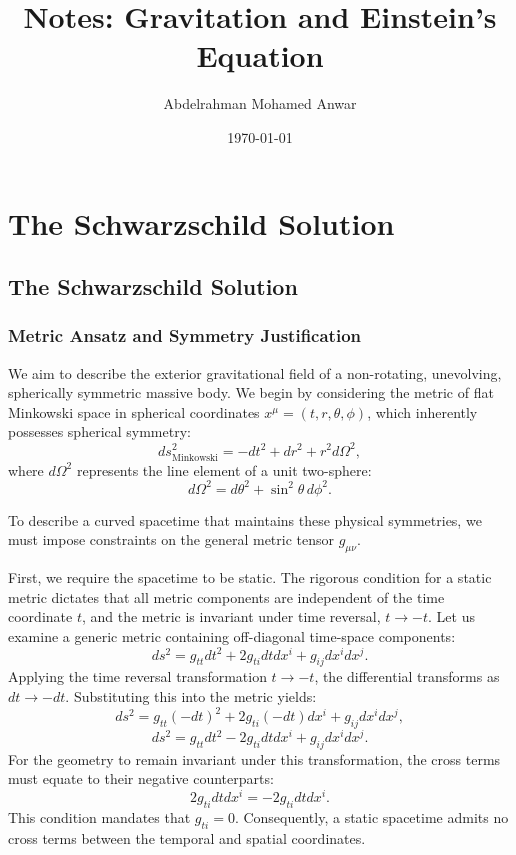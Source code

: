 \documentclass[11pt, a4paper]{report}
\title{Notes: Gravitation and Einstein's Equation}
\author{Abdelrahman Mohamed Anwar}
\date{\today}
\begin{document}
\tableofcontents

\chapter{The Schwarzschild Solution}
\section{The Schwarzschild Solution}

\subsection{Metric Ansatz and Symmetry Justification}

We aim to describe the exterior gravitational field of a non-rotating, unevolving, spherically symmetric massive body. We begin by considering the metric of flat Minkowski space in spherical coordinates $x^\mu = (t, r, \theta, \phi)$, which inherently possesses spherical symmetry:
\begin{equation}
ds_{\text{Minkowski}}^2 = -dt^2 + dr^2 + r^2 d\Omega^2,
\end{equation}
where $d\Omega^2$ represents the line element of a unit two-sphere:
\begin{equation}
d\Omega^2 = d\theta^2 + \sin^2\theta \, d\phi^2.
\end{equation}

To describe a curved spacetime that maintains these physical symmetries, we must impose constraints on the general metric tensor $g_{\mu\nu}$. 

First, we require the spacetime to be static. The rigorous condition for a static metric dictates that all metric components are independent of the time coordinate $t$, and the metric is invariant under time reversal, $t \rightarrow -t$. Let us examine a generic metric containing off-diagonal time-space components:
\begin{equation}
ds^2 = g_{tt} dt^2 + 2 g_{ti} dt dx^i + g_{ij} dx^i dx^j.
\end{equation}
Applying the time reversal transformation $t \rightarrow -t$, the differential transforms as $dt \rightarrow -dt$. Substituting this into the metric yields:
\begin{equation}
ds^2 = g_{tt} (-dt)^2 + 2 g_{ti} (-dt) dx^i + g_{ij} dx^i dx^j,
\end{equation}
\begin{equation}
ds^2 = g_{tt} dt^2 - 2 g_{ti} dt dx^i + g_{ij} dx^i dx^j.
\end{equation}
For the geometry to remain invariant under this transformation, the cross terms must equate to their negative counterparts:
\begin{equation}
2 g_{ti} dt dx^i = -2 g_{ti} dt dx^i.
\end{equation}
This condition mandates that $g_{ti} = 0$. Consequently, a static spacetime admits no cross terms between the temporal and spatial coordinates. 
\end{document}
